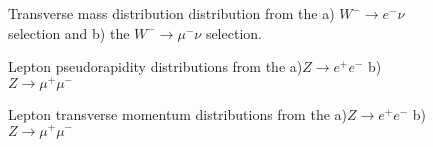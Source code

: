 \begin{figure}[h]
\begin{minipage}[h]{0.49\linewidth}
\end{minipage}
\hfill
\begin{minipage}[h]{0.49\linewidth}
\end{minipage}
\caption{Transverse mass distribution distribution from the a) $W^{-} \to e^{-} \nu$ selection and  b) the $W^{-} \to \mu^{-} \nu$ selection.}
\label{ris:WlnumtWM}
\end{figure}


\begin{figure}[h]
\begin{minipage}[h]{0.49\linewidth}
\end{minipage}
\hfill
\begin{minipage}[h]{0.49\linewidth}
\end{minipage}
\caption{ Lepton pseudorapidity distributions from the a)$Z\to e^{+}e^{-}$ b) $Z\to \mu^{+}\mu^{-}$}
\label{ris:Zll}
\end{figure}

\begin{figure}[h]
\begin{minipage}[h]{0.49\linewidth}
\end{minipage}
\hfill
\begin{minipage}[h]{0.49\linewidth}
\end{minipage}
\caption{Lepton transverse momentum distributions from the a)$Z\to e^{+}e^{-}$ b) $Z\to \mu^{+}\mu^{-}$}

\end{figure}

